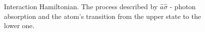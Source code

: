 \begin{figure}
\centering



\caption{Interaction Hamiltonian. The process described by $\hat{a}\hat{\sigma}$ - photon absorption and the atom's transition from the upper state to the lower one.}
\label{figPart1Ch2_2_1}
\end{figure}